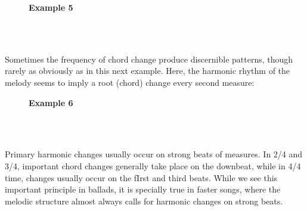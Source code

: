 \documentclass{article} %
\numberwithin{equation}{section} %
\begin{document}
		\begin{figure}[H]
		\textbf{Example 5}
		
		\\

		\\
		\end{figure}

		Sometimes the frequency of chord change produce discernible patterns, though rarely as obviously as in this next example. Here, the harmonic rhythm of the melody seems to imply a root (chord) change every second measure: \\

		\begin{figure}[H]
		\textbf{Example 6}
		
		\\

		\\
		\end{figure}

		Primary harmonic changes usually occur on strong beats of measures. In 2/4 and 3/4, important chord changes generally take place on the downbeat, while in 4/4 time, changes usually occur on the fIrst and third beats. While we see this important principle in ballads, it is specially true in faster songs, where the melodic structure almost always calls for harmonic changes on strong beats. \\
\end{document}
